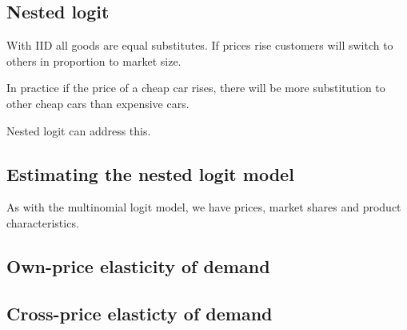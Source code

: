 
\subsection{Nested logit}

With IID all goods are equal substitutes. If prices rise customers will switch to others in proportion to market size.

In practice if the price of a cheap car rises, there will be more substitution to other cheap cars than expensive cars.

Nested logit can address this.

\subsection{Estimating the nested logit model}

As with the multinomial logit model, we have prices, market shares and product characteristics.

\subsection{Own-price elasticity of demand}

\subsection{Cross-price elasticty of demand}


